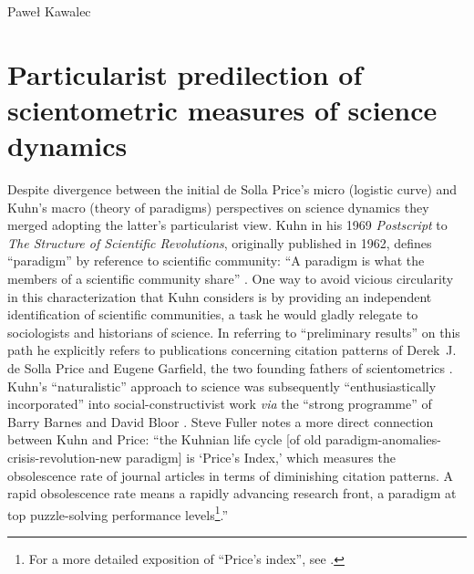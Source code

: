 \begin{artengenv}{Paweł Kawalec}
\section{Particularist predilection of scientometric measures of science dynamics}
Despite divergence between the initial de Solla Price's micro (logistic curve) and Kuhn's macro (theory of paradigms) perspectives on science dynamics
\parencite[][]{shapin_kuhns_2015} %
 they merged adopting the latter's particularist view. Kuhn in his 1969 \textit{Postscript} to \textit{The Structure of Scientific Revolutions}, originally published in 1962, defines ``paradigm'' by reference to scientific community: ``A paradigm is what the members of a scientific community share'' 
\parencite[][p.176]{kuhn_structure_1970}. %
 One way to avoid vicious circularity in this characterization that Kuhn considers is by providing an independent identification of scientific communities, a task he would gladly relegate to sociologists and historians of science. In referring to ``preliminary results'' on this path he explicitly refers to publications concerning citation patterns of Derek~J. de Solla Price and Eugene Garfield, the two founding fathers of scientometrics 
\parencite[][p.178 n.6]{kuhn_structure_1970}. %
 Kuhn's ``naturalistic'' approach to science was subsequently ``enthusiastically incorporated'' into social-constructivist work \textit{via} the ``strong programme'' of Barry Barnes and David Bloor 
\parencite[][]{shapin_kuhns_2015}. %
 Steve Fuller 
\parencite[][p.270 n.107]{fuller_being_1992} %
 notes a more direct connection between Kuhn and Price: ``the Kuhnian life cycle [of old paradigm-anomalies-crisis-revolution-new paradigm] is ‘Price's Index,' which measures the obsolescence rate of journal articles in terms of diminishing citation patterns. A rapid obsolescence rate means a rapidly advancing research front, a paradigm at top puzzle-solving performance levels\footnote{For a more detailed exposition of ``Price's index'', see 
 \parencite[][pp.148–170]{de_mey_cognitive_1982}.%
 }.''


\end{artengenv}

